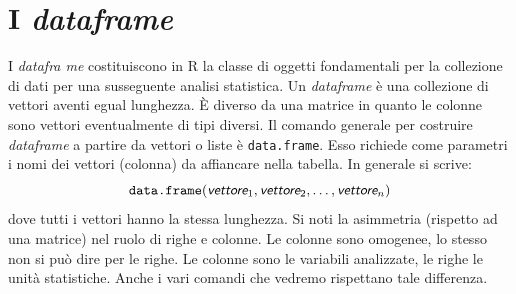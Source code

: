 \documentclass[onecolumn,11pt]{book}
\newcommand{\varia}[1]{\textsl{\textsf{#1}}}
\begin{document}
 \section{I \emph{dataframe}}

I \emph{datafra me} costituiscono in {\textsf R} la classe di oggetti fondamentali per la collezione di dati per una susseguente analisi statistica.  
Un \emph{dataframe}  \`e una collezione di vettori aventi egual lunghezza. \`E diverso da una matrice in quanto le colonne sono vettori eventualmente di tipi diversi. Il comando generale per costruire \emph{dataframe} a partire da vettori o liste 
\`e \texttt{data.frame}.  Esso richiede come parametri i nomi dei vettori (colonna) da affiancare nella tabella. In generale si scrive:
\begin{equation*}\texttt{data.frame}(\varia{vettore}_1,\varia{vettore}_2, \ldots, \varia{vettore}_n)\end{equation*}
dove tutti i vettori hanno la stessa lunghezza. 
Si noti la asimmetria  (rispetto ad una matrice) nel ruolo di righe e colonne. Le colonne sono omogenee, lo stesso non si pu\`o dire per le righe. Le colonne sono le variabili analizzate, le righe le unit\`a statistiche. Anche i vari comandi che vedremo rispettano tale differenza.
\end{document}
